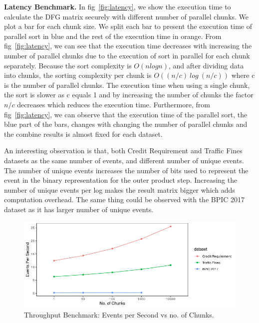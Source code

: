 \textbf{Latency Benchmark.} In fig~\ref{fig:latency}, we show the execution time to calculate the DFG matrix securely with different number of parallel chunks. We plot a bar for each chunk size. We split each bar to present the execution time of parallel sort in blue and the rest of the execution time in orange. From fig~\ref{fig:latency}, we can see that the execution time decreases with increasing the number of parallel chunks due to the execution of sort in parallel for each chunk separately. Because the sort complexity is $O(n log n)$, and after dividing data into chunks, the sorting complexity per chunk is $O((n/c) \: log  \: (n/c))$ where c is the number of parallel chunks. The execution time when using a single chunk, the sort is slower as c equals 1 and by increasing the number of chunks the factor $n/c$ decreases which reduces the execution time.  Furthermore, from fig~\ref{fig:latency}, we can observe that the execution time of the parallel sort, the blue part of the bars, changes with changing the number of parallel chunks and the combine results is almost fixed for each dataset. 

An interesting observation is that, both Credit Requirement and Traffic Fines datasets as the same number of events, and different number of unique events. The number of unique events increases the number of bits used to represent the event in the binary representation for the outer product step. Increasing the number of unique events per log makes the result matrix bigger which adds computation overhead. The same thing could be observed with the BPIC 2017 dataset as it has larger number of unique events.


\begin{figure}[!htb]
	\centering
	\includegraphics[width=.95\columnwidth]{figures/throughput.png}
	\caption{Throughput Benchmark: Events per Second vs no. of Chunks.}
	\label{fig:throughput}
\end{figure}

